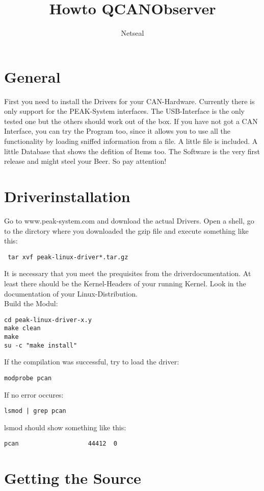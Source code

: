 \documentclass[a4paper,10pt]{article}
\title{Howto QCANObserver}
\author{Netseal}
\begin{document}
\maketitle
\section{General}
First you need to install the Drivers for your CAN-Hardware. Currently there is only support for the PEAK-System interfaces. The USB-Interface is the only tested one but the others should work out of the box. If you have not got a CAN Interface, you can try the Program too, since it allows you to use all the functionality by loading sniffed information from a file. A little file is included. A little Database that shows the defition of Items too. The Software is the very first release and might steel your Beer. So pay attention!


\section{Driverinstallation}
Go to www.peak-system.com and download the actual Drivers.
Open a shell, go to the dirctory where you downloaded the gzip file and execute something like this:
\begin{verbatim}
 tar xvf peak-linux-driver*.tar.gz
\end{verbatim} 
It is necessary that you meet the prequisites from the driverdocumentation.
At least there should be the Kernel-Headers of your running Kernel. Look in the documentation of your Linux-Distribution.\\
Build the Modul:
\begin{verbatim}
cd peak-linux-driver-x.y
make clean
make
su -c "make install"
\end{verbatim} 
If the compilation was successful, try to load the driver:

\begin{verbatim}
modprobe pcan
\end{verbatim} 
If no error occures:

\begin{verbatim}
lsmod | grep pcan
\end{verbatim} 
lsmod should show something like this:

\begin{verbatim}
pcan                   44412  0
\end{verbatim} 

\section{Getting the Source}
\end{document}
